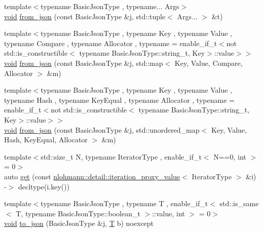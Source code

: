 \begin{DoxyCompactItemize}
\item 
{\footnotesize template$<$typename Basic\+Json\+Type , typename... Args$>$ }\\\mbox{\hyperlink{namespacenlohmann_1_1detail_a59fca69799f6b9e366710cb9043aa77d}{void}} \mbox{\hyperlink{namespacenlohmann_1_1detail_a8b99ec9b29f3f20a18fc4281fb784e49}{from\+\_\+json}} (const Basic\+Json\+Type \&j, std\+::tuple$<$ Args... $>$ \&t)
\item 
{\footnotesize template$<$typename Basic\+Json\+Type , typename Key , typename Value , typename Compare , typename Allocator , typename  = enable\+\_\+if\+\_\+t$<$not std\+::is\+\_\+constructible$<$                                     typename Basic\+Json\+Type\+::string\+\_\+t, Key$>$\+::value$>$$>$ }\\\mbox{\hyperlink{namespacenlohmann_1_1detail_a59fca69799f6b9e366710cb9043aa77d}{void}} \mbox{\hyperlink{namespacenlohmann_1_1detail_ae93147a54d2740228ef16a5e6210ca3e}{from\+\_\+json}} (const Basic\+Json\+Type \&j, std\+::map$<$ Key, Value, Compare, Allocator $>$ \&m)
\item 
{\footnotesize template$<$typename Basic\+Json\+Type , typename Key , typename Value , typename Hash , typename Key\+Equal , typename Allocator , typename  = enable\+\_\+if\+\_\+t$<$not std\+::is\+\_\+constructible$<$                                     typename Basic\+Json\+Type\+::string\+\_\+t, Key$>$\+::value$>$$>$ }\\\mbox{\hyperlink{namespacenlohmann_1_1detail_a59fca69799f6b9e366710cb9043aa77d}{void}} \mbox{\hyperlink{namespacenlohmann_1_1detail_aef5c8ea108f4d2b03fb4a635617510de}{from\+\_\+json}} (const Basic\+Json\+Type \&j, std\+::unordered\+\_\+map$<$ Key, Value, Hash, Key\+Equal, Allocator $>$ \&m)
\item 
{\footnotesize template$<$std\+::size\+\_\+t N, typename Iterator\+Type , enable\+\_\+if\+\_\+t$<$ N==0, int $>$  = 0$>$ }\\auto \mbox{\hyperlink{namespacenlohmann_1_1detail_acc422c11342b31368f610b6f96fcedc6}{get}} (const \mbox{\hyperlink{classnlohmann_1_1detail_1_1iteration__proxy__value}{nlohmann\+::detail\+::iteration\+\_\+proxy\+\_\+value}}$<$ Iterator\+Type $>$ \&i) -\/$>$ decltype(i.\+key())
\item 
{\footnotesize template$<$typename Basic\+Json\+Type , typename T , enable\+\_\+if\+\_\+t$<$ std\+::is\+\_\+same$<$ T, typename Basic\+Json\+Type\+::boolean\+\_\+t $>$\+::value, int $>$  = 0$>$ }\\\mbox{\hyperlink{namespacenlohmann_1_1detail_a59fca69799f6b9e366710cb9043aa77d}{void}} \mbox{\hyperlink{namespacenlohmann_1_1detail_a1a804b98cbe89b7e44b698f2ca860490}{to\+\_\+json}} (Basic\+Json\+Type \&j, \mbox{\hyperlink{_keyboard_event_8h_adf1f3edb9115acb0a1e04209b7a9937b}{T}} b) noexcept

\end{DoxyCompactItemize}
